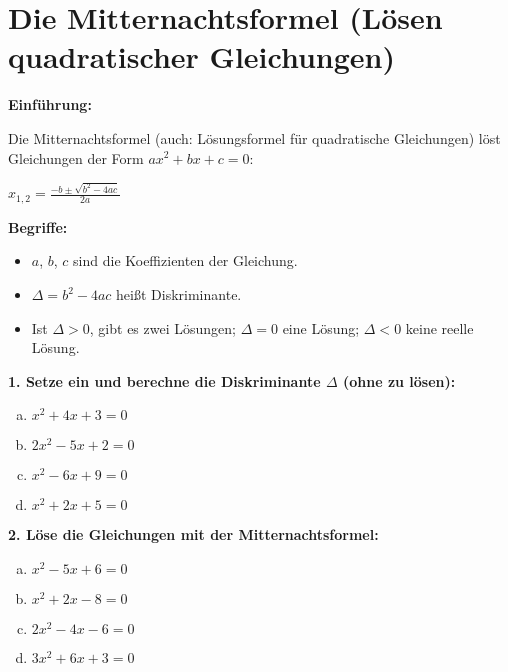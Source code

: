 \section*{Die Mitternachtsformel (Lösen quadratischer Gleichungen)}

\textbf{Einführung:}

Die Mitternachtsformel (auch: Lösungsformel für quadratische Gleichungen) löst Gleichungen der Form $ax^2 + bx + c = 0$:

\begin{center}
$\displaystyle x_{1,2} = \frac{-b \pm \sqrt{b^2 - 4ac}}{2a}$
\end{center}

\textbf{Begriffe:}
\begin{itemize}
    \item $a$, $b$, $c$ sind die Koeffizienten der Gleichung.
    \item $\Delta = b^2 - 4ac$ heißt Diskriminante.
    \item Ist $\Delta > 0$, gibt es zwei Lösungen; $\Delta = 0$ eine Lösung; $\Delta < 0$ keine reelle Lösung.
\end{itemize}

\vspace{0.5em}

\textbf{1. Setze ein und berechne die Diskriminante $\Delta$ (ohne zu lösen):}
\begin{multicols}{2}
\begin{enumerate}[a)]
    \item $x^2 + 4x + 3 = 0$
    \item $2x^2 - 5x + 2 = 0$
    \item $x^2 - 6x + 9 = 0$
    \item $x^2 + 2x + 5 = 0$
\end{enumerate}
\end{multicols}

\vspace{0.5em}

\textbf{2. Löse die Gleichungen mit der Mitternachtsformel:}
\begin{multicols}{2}
\begin{enumerate}[a)]
    \item $x^2 - 5x + 6 = 0$
    \item $x^2 + 2x - 8 = 0$
    \item $2x^2 - 4x - 6 = 0$
    \item $3x^2 + 6x + 3 = 0$
\end{enumerate}
\end{multicols}

